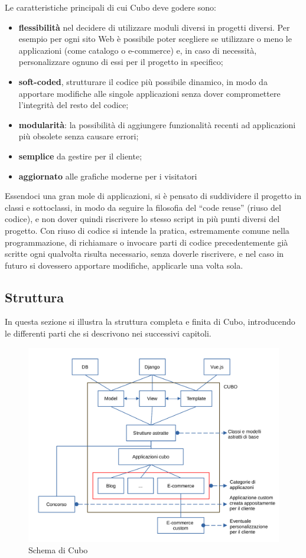 \documentclass[12pt,a4paper]{article}
\begin{document}
Le caratteristiche principali di cui Cubo deve godere sono:
\begin{itemize}
    \item \textbf{flessibilità} nel decidere di utilizzare moduli diversi in progetti diversi. Per esempio per ogni sito Web è possibile poter scegliere se utilizzare o meno le applicazioni (come catalogo o e-commerce) e, in caso di necessità, personalizzare ognuno di essi per il progetto in specifico;
    \item \textbf{soft-coded}, strutturare il codice più possibile dinamico, in modo da apportare modifiche alle singole applicazioni senza dover compromettere l’integrità del resto del codice;
    \item \textbf{modularità}: la possibilità di aggiungere funzionalità recenti ad applicazioni più obsolete senza causare errori;
    \item \textbf{semplice} da gestire per il cliente;
    \item \textbf{aggiornato} alle grafiche moderne per i visitatori
\end{itemize}
Essendoci una gran mole di applicazioni, si è pensato di suddividere il progetto in classi e sottoclassi, in modo da seguire la filosofia del “code reuse” (riuso del codice), e non dover quindi riscrivere lo stesso script in più punti diversi del progetto.
Con riuso di codice si intende la pratica, estremamente comune nella programmazione, di richiamare o invocare parti di codice precedentemente già scritte ogni qualvolta risulta necessario, senza doverle riscrivere, e nel caso in futuro si dovessero apportare modifiche, applicarle una volta sola.

\clearpage

\subsection{Struttura}
In questa sezione si illustra la struttura completa e finita di Cubo, introducendo le differenti parti che si descrivono nei successivi capitoli.
\begin{figure}[H]
    \includegraphics[width=1\linewidth]{cubo_scheme.png}
    \caption{Schema di Cubo}
\end{figure}
\end{document}
